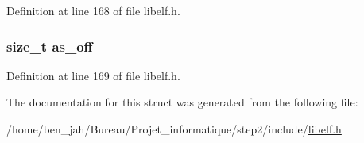 \-Definition at line 168 of file libelf.\-h.

\hypertarget{struct_elf___arsym_a4869060e98029b805d64f425d24edc70}{
\subsubsection[{as\-\_\-off}]{\setlength{\rightskip}{0pt plus 5cm}size\-\_\-t {\bf as\-\_\-off}}}\label{struct_elf___arsym_a4869060e98029b805d64f425d24edc70}


\-Definition at line 169 of file libelf.\-h.



\-The documentation for this struct was generated from the following file\-:\begin{DoxyCompactItemize}
\item 
/home/ben\-\_\-jah/\-Bureau/\-Projet\-\_\-informatique/step2/include/\hyperlink{libelf_8h}{libelf.\-h}\end{DoxyCompactItemize}
